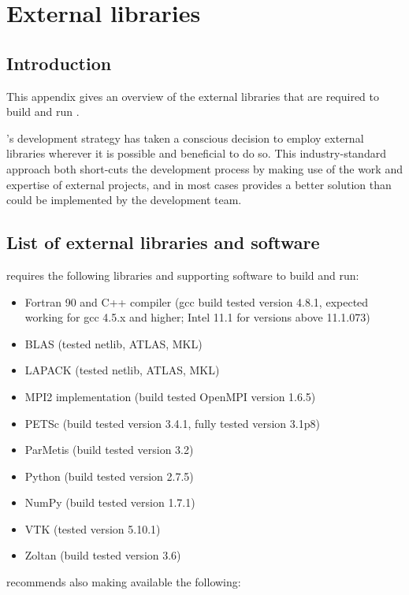 \chapter{External libraries}\label{chap:external}

\section{Introduction}

This appendix gives an overview of the external libraries that are required to
build and run \fluidity.

\fluidity's development strategy has taken a conscious decision to employ
external libraries wherever it is possible and beneficial to do so. This
industry-standard approach both short-cuts the development process by making
use of the work and expertise of external projects, and in most cases provides
a better solution than could be implemented by the \fluidity development team.

\section{List of external libraries and software}
\label{sec:required_ḻibraries_list}

\fluidity requires the following libraries and supporting software to build and
run:

\begin{itemize}
\item Fortran 90 and C++ compiler (gcc build tested version 4.8.1, expected working for gcc 4.5.x and higher; Intel 11.1 for versions above 11.1.073)
\item BLAS (tested netlib, ATLAS, MKL)
\item LAPACK (tested netlib, ATLAS, MKL)
\item MPI2 implementation (build tested OpenMPI version 1.6.5)
\item PETSc (build tested version 3.4.1, fully tested version 3.1p8)
\item ParMetis (build tested version 3.2)
\item Python (build tested version 2.7.5) 
\item NumPy (build tested version 1.7.1)
\item VTK (tested version 5.10.1)
\item Zoltan (build tested version 3.6)
\end{itemize}

\fluidity recommends also making available the following:

